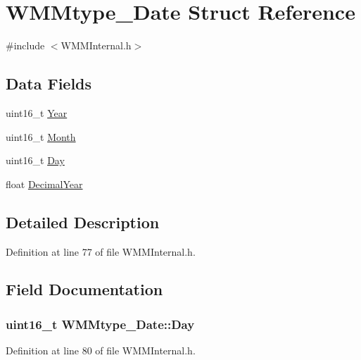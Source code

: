 \hypertarget{struct_w_m_mtype___date}{\section{\-W\-M\-Mtype\-\_\-\-Date \-Struct \-Reference}
\label{struct_w_m_mtype___date}
}


{\ttfamily \#include $<$\-W\-M\-M\-Internal.\-h$>$}

\subsection*{\-Data \-Fields}
\begin{DoxyCompactItemize}
\item 
uint16\-\_\-t \hyperlink{struct_w_m_mtype___date_a82ccdb4608f69fe13225f5add055d3ad}{\-Year}
\item 
uint16\-\_\-t \hyperlink{struct_w_m_mtype___date_a7f47a103df8618aac10b109fd5b149c4}{\-Month}
\item 
uint16\-\_\-t \hyperlink{struct_w_m_mtype___date_ae181b3f6292dbe3b6f89e412c977b1e1}{\-Day}
\item 
float \hyperlink{struct_w_m_mtype___date_a68078d5d0181333dcf11e24171a218f2}{\-Decimal\-Year}
\end{DoxyCompactItemize}


\subsection{\-Detailed \-Description}


\-Definition at line 77 of file \-W\-M\-M\-Internal.\-h.



\subsection{\-Field \-Documentation}
\hypertarget{struct_w_m_mtype___date_ae181b3f6292dbe3b6f89e412c977b1e1}{
\subsubsection[{\-Day}]{\setlength{\rightskip}{0pt plus 5cm}uint16\-\_\-t {\bf \-W\-M\-Mtype\-\_\-\-Date\-::\-Day}}}\label{struct_w_m_mtype___date_ae181b3f6292dbe3b6f89e412c977b1e1}


\-Definition at line 80 of file \-W\-M\-M\-Internal.\-h.

